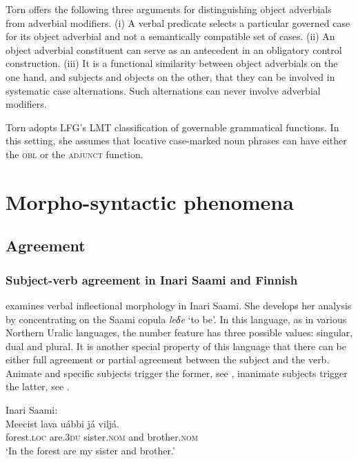 \documentclass[output=paper,hidelinks]{langscibook}
\begin{document}
Torn offers the following three arguments for distinguishing object adverbials from adverbial modifiers. (i) A verbal predicate selects a particular governed case for its object adverbial and not a semantically compatible set of cases. (ii) An object adverbial constituent can serve as an antecedent in an obligatory control construction. (iii) It is a functional similarity between object adverbials on the one hand, and subjects and objects on the other, that they can be involved in systematic case alternations. Such alternations can never involve adverbial modifiers.


Torn adopts LFG's LMT classification of governable grammatical functions. In this setting, she assumes that locative case-marked noun phrases can have either the \textsc{obl} or the \textsc{adjunct} function.

\section{Morpho-syntactic phenomena}
\label{sec:FinnoUgric:7}

\subsection{Agreement}
\label{sec:FinnoUgric:7.1}

\subsubsection{Subject-verb agreement in Inari Saami and Finnish}
\label{sec:FinnoUgric:7.1.1}

\citet{Toivonen2007} examines verbal inflectional morphology in Inari Saami. She develops her analysis by concentrating on the Saami copula \textit{leδe} `to be'. In this language, as in various Northern Uralic languages, the number feature has three possible values: singular, dual and plural. It is another special property of this language that there can be either full agreement or partial agreement between the subject and the verb. Animate and specific subjects trigger the former, see , inanimate subjects trigger the latter, see .

\ea%
    \label{ex:FinnoUgric:41}Inari Saami:\\
    \gll Meecist lava uábbi já viljá.\\
        forest.\textsc{loc} are.\textsc{3du} sister.\textsc{nom} and brother.\textsc{nom}\\
    \glt `In the forest are my sister and brother.'
    \z
\end{document}

